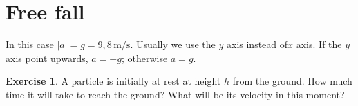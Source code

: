 \documentclass[12pt,a4paper]{article}
\theoremstyle{definition}
\newtheorem{ex}{Exercise}[section]
\begin{document}
\section{Free fall}

In this case $|a|=g=9{,}8\,\mathrm{m/s}$. Usually we use the $y$ axis
instead of$x$ axis. If the $y$ axis point upwards, $a=-g$; otherwise
$a=g$.

\begin{ex}
  A particle is initially at rest at height $h$ from the ground. How
  much time it will take to reach the ground? What will be its
  velocity in this moment?
\end{ex}
\end{document}
